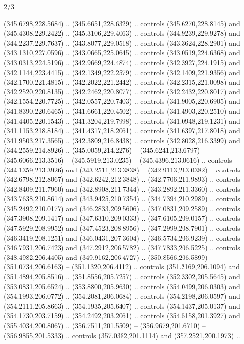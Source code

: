 \begin{flagdescription}{2/3}
\begin{scope}[xshift=0.5\flaglength,yshift=0.5\flagwidth,scale=\flagwidth/495.65]
\begin{scope}[y=0.8pt, x=0.8pt, yscale=-1,shift={(-463.76,-309.78)}]
  (345.6798,228.5684) .. (345.6651,228.6329) .. controls (345.6270,228.8145) and
  (345.4308,229.2422) .. (345.3106,229.4063) .. controls (344.9239,229.9278) and
  (344.2237,229.7637) .. (343.8077,229.0518) .. controls (343.3624,228.2901) and
  (343.1310,227.0596) .. (343.0665,225.0645) .. controls (343.0519,224.6368) and
  (343.0313,224.5196) .. (342.9669,224.4874) .. controls (342.3927,224.1915) and
  (342.1144,223.4415) .. (342.1349,222.2579) .. controls (342.1409,221.9356) and
  (342.1700,221.4815) .. (342.2022,221.2442) .. controls (342.2315,221.0098) and
  (342.2520,220.8135) .. (342.2462,220.8077) .. controls (342.2432,220.8017) and
  (342.1554,220.7725) .. (342.0557,220.7403) .. controls (341.9005,220.6905) and
  (341.8390,220.6465) .. (341.6661,220.4502) .. controls (341.4903,220.2510) and
  (341.4405,220.1543) .. (341.3204,219.7998) .. controls (341.0948,219.1231) and
  (341.1153,218.8184) .. (341.4317,218.2061) .. controls (341.6397,217.8018) and
  (341.9503,217.3565) .. (342.3809,216.8438) .. controls (342.8028,216.3399) and
  (344.2559,214.8926) .. (345.0059,214.2276) -- (345.6241,213.6797) --
  (345.6066,213.3516) -- (345.5919,213.0235) -- (345.4396,213.0616) .. controls
  (344.1359,213.3926) and (343.2511,213.3838) .. (342.9113,213.0382) .. controls
  (342.6798,212.8067) and (342.6242,212.3848) .. (342.7706,211.9893) .. controls
  (342.8409,211.7960) and (342.8908,211.7344) .. (343.2892,211.3360) .. controls
  (343.7638,210.8614) and (343.9425,210.7354) .. (344.7394,210.2989) .. controls
  (345.2492,210.0177) and (346.2833,209.5606) .. (347.0831,209.2589) .. controls
  (347.3908,209.1417) and (347.6310,209.0333) .. (347.6105,209.0157) .. controls
  (347.5929,208.9952) and (347.4523,208.8956) .. (347.2999,208.7901) .. controls
  (346.3419,208.1251) and (346.0431,207.3604) .. (346.5734,206.9239) .. controls
  (346.7931,206.7423) and (347.2912,206.5782) .. (347.7833,206.5225) .. controls
  (348.4982,206.4405) and (349.9162,206.4727) .. (350.8566,206.5899) --
  (351.0734,206.6163) -- (351.1320,206.4112) .. controls (351.2169,206.1094) and
  (351.4894,205.8516) .. (351.8556,205.7257) .. controls (352.3302,205.5645) and
  (353.0831,205.6524) .. (353.8800,205.9630) .. controls (354.0499,206.0303) and
  (354.1993,206.0772) .. (354.2081,206.0684) .. controls (354.2198,206.0597) and
  (354.2111,205.8663) .. (354.1935,205.6407) .. controls (354.1437,205.0137) and
  (354.1730,203.7159) .. (354.2492,203.2061) .. controls (354.5158,201.3927) and
  (355.4034,200.8067) .. (356.7511,201.5509) -- (356.9679,201.6710) --
  (356.9855,201.5333) .. controls (357.0382,201.1114) and (357.2521,200.1973) ..

\end{scope}
\end{scope}
\end{flagdescription}
